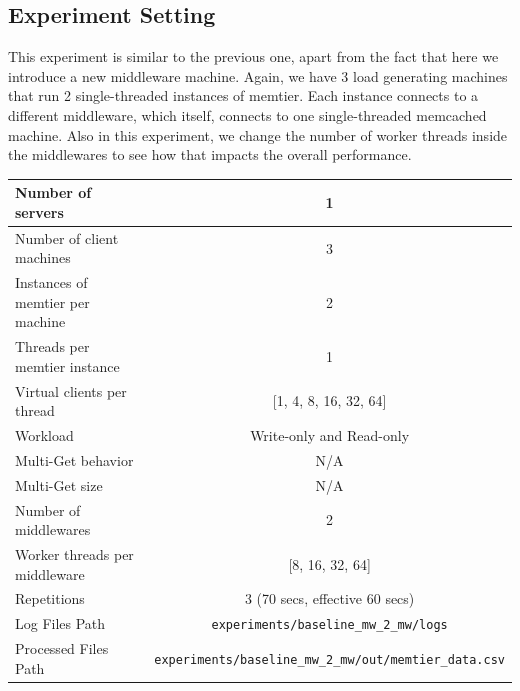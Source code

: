 \documentclass[11pt,a4paper]{article}
\begin{document}
\subsection{Experiment Setting}

This experiment is similar to the previous one, apart from the fact that here we introduce a new middleware machine.
Again, we have 3 load generating machines that run 2 single-threaded instances of memtier. Each instance connects to a different middleware, which itself, connects to one single-threaded memcached machine. Also in this experiment, we change the number of worker threads inside the middlewares to see how that impacts the overall performance.

\begin{center}
	\scriptsize{
		\begin{tabular}{|l|c|}
			\hline Number of servers                & 1                        \\ 
			\hline Number of client machines        & 3                        \\ 
			\hline Instances of memtier per machine & 2                        \\ 
			\hline Threads per memtier instance     & 1                        \\
			\hline Virtual clients per thread       & [1, 4, 8, 16, 32, 64]                  \\ 
			\hline Workload                         & Write-only and Read-only \\
			\hline Multi-Get behavior               & N/A                      \\
			\hline Multi-Get size                   & N/A                      \\
			\hline Number of middlewares            & 2                        \\
			\hline Worker threads per middleware    & [8, 16, 32, 64]                  \\
            \hline Repetitions                      & 3 (70 secs, effective 60 secs) \\ 
            \hline Log Files Path                   & \texttt{experiments/baseline\_mw\_2\_mw/logs} \\
            \hline Processed Files Path             & \texttt{experiments/baseline\_mw\_2\_mw/out/memtier\_data.csv}\\
            \hline
		\end{tabular}
	} 
\end{center}
\end{document}
